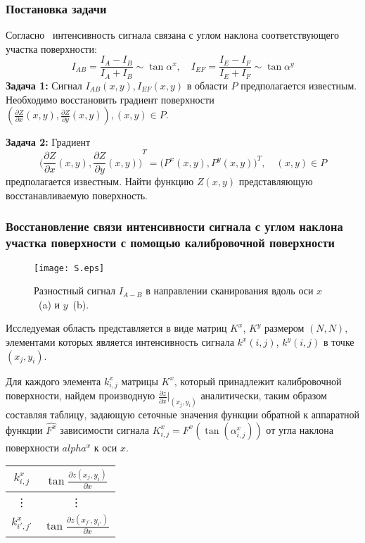 \documentclass{beamer}
\begin{document}
\begin{frame}
    \frametitle{Постановка задачи}
    Согласно~\cite{PaluszynskiSlowko2005Vacuum, DrzazgaPaluszynski2005Measurement} интенсивность сигнала связана с углом наклона соответствующего участка поверхности:
    $$ I_{AB} = \frac{I_A - I_B}{I_A + I_B} \sim \tan{\alpha^x}, \quad I_{EF} = \frac{I_E - I_F}{I_E + I_F} \sim \tan{\alpha^y} $$
    \textbf{Задача 1:} Сигнал $I_{AB}(x,y), I_{EF}(x,y)$ в области $P$ предполагается известным. Необходимо восстановить градиент поверхности $\left(\frac{\partial Z}{\partial x}(x,y), \frac{\partial Z}{\partial y} (x,y) \right), (x,y) \in P$.

    \vfill

    \textbf{Задача 2:} Градиент
    \begin{equation}
        {\Big(\frac{\partial Z}{\partial x}(x,y),
        \frac{\partial Z}{\partial y} (x,y)\Big)}^{T} =
        {\big(P^x(x,y), P^y(x,y)\big)}^T, \quad (x,y) \in P
    \end{equation}
    предполагается известным. Найти функцию $Z(x,y)$ представляющую восстанавливаемую поверхность.
\end{frame}

\begin{frame}[allowframebreaks]
    \frametitle{Восстановление связи интенсивности сигнала с углом наклона участка поверхности с помощью калибровочной поверхности}


    \begin{figure}[hp]
        \texttt{[image: S.eps]}
        \caption{\small Разностный сигнал $I_{A-B}$ в направлении сканирования вдоль оси $x$~(a) и $y$~(b).}
        {\label{fig:inputSphere}}%
    \end{figure}

    \newpage
    Исследуемая область представляется в виде матриц $K^x$, $K^y$ размером $(N,N)$, элементами которых является интенсивность сигнала $k^x (i,j)$, $k^y (i,j)$ в точке $(x_j, y_i)$.

    Для каждого элемента $k^x_{i,j}$ матрицы $K^x$, который принадлежит калибровочной поверхности, найдем производную $\frac{\partial z}{\partial x} \big|_{(x_j,y_i)} $ аналитически, таким образом составляя таблицу, задающую сеточные значения функции обратной к аппаратной функции $\hat{F^x}$ зависимости сигнала $K^x_{i,j} = F^x (\tan(\alpha^x_{i,j}))$ от угла наклона поверхности $alpha^x$ к оси $x$.
    \begin{center}
        \begin{tabular}{| c| c |}
            \hline
            $ k^x_{i,j} $ & $ \tan{ \frac{\partial z(x_j, y_i)}{\partial x} } $ \\
            \hline
            \vdots          & \vdots \\
            \hline
            $ k^x_{i',j'} $ & $ \tan{ \frac{\partial z(x_{j'}, y_{i'})}{\partial x} } $ \\
            \hline
        \end{tabular}
    \end{center}

\end{frame}
\end{document}
